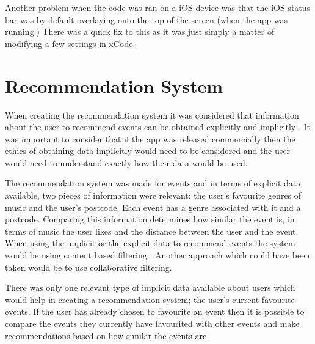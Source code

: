 Another problem when the code was ran on a iOS device was that the iOS status bar was by default overlaying onto the top of the screen (when the app was running.) There was a quick fix to this as it was just simply a matter of modifying a few settings in xCode.


\section{Recommendation System}
When creating the recommendation system it was considered that information about the user to recommend events can be obtained explicitly and implicitly \cite{ML}. It was important to consider that if the app was released commercially then the ethics of obtaining data implicitly would need to be considered and the user would need to understand exactly how their data would be used.

The recommendation system was made for events and in terms of explicit data available, two pieces of information were relevant: the user's favourite genres of music and the user's postcode. Each event has a genre associated with it and a postcode. Comparing this information determines how similar the event is, in terms of music the user likes and the distance between the user and the event. When using the implicit or the explicit data to recommend events the system would be using content based filtering \cite{san}. Another approach which could have been taken would be to use collaborative filtering. \cite{collab}

There was only one relevant type of implicit data available about users which would help in creating a recommendation system; the user's current favourite events. If the user has already chosen to favourite an event then it is possible to compare the events they currently have favourited with other events and make recommendations based on how similar the events are.

